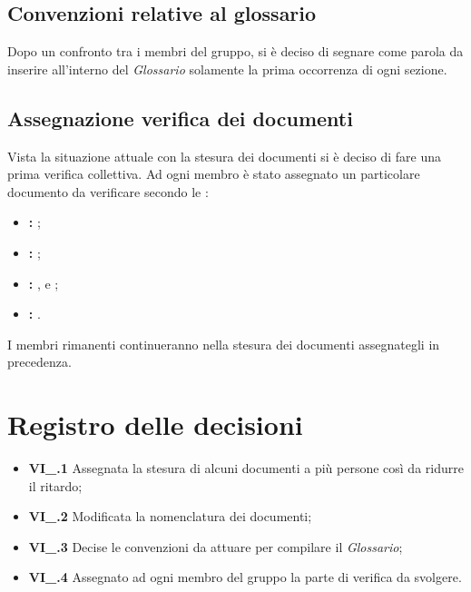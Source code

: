 \subsection{Convenzioni relative al glossario}
Dopo un confronto tra i membri del gruppo, si è deciso di segnare come parola da inserire all'interno del \textit{Glossario} solamente la prima occorrenza di ogni sezione.

\subsection{Assegnazione verifica dei documenti}
Vista la situazione attuale con la stesura dei documenti si è deciso di fare una prima verifica collettiva. Ad ogni membro è stato assegnato un particolare documento da verificare secondo le \textit{\NdP}:
\begin{itemize}
	\item \textbf{\SdF{}:} \TG{};
	\item \textbf{\AdR{}:} \VD{};
	\item \textbf{\NdP{}:} \BL{},\TL{} e \MM{};
	\item \textbf{\PdP{}:} \PC{}.
\end{itemize}
I membri rimanenti continueranno nella stesura dei documenti assegnategli in precedenza.

\section{Registro delle decisioni}
\begin{itemize}
  \item \textbf{VI\_\Data.1} Assegnata la stesura di alcuni documenti a più persone così da ridurre il ritardo;
  \item \textbf{VI\_\Data.2} Modificata la nomenclatura dei documenti;
  \item \textbf{VI\_\Data.3} Decise le convenzioni da attuare per compilare il \textit{Glossario};
  \item \textbf{VI\_\Data.4} Assegnato ad ogni membro del gruppo la parte di verifica da svolgere.
\end{itemize}




